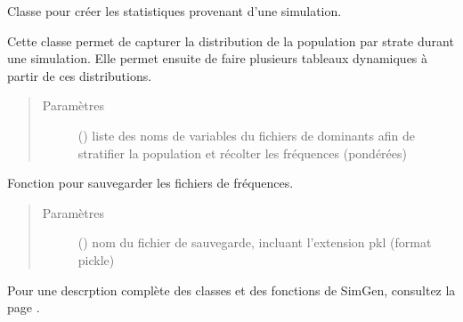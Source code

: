 \documentclass[letterpaper,10pt,french]{sphinxmanual}
\begin{document}
\begin{fulllineitems}
Classe pour créer les statistiques provenant d’une simulation.

Cette classe permet de capturer la distribution de la population par strate durant une simulation. Elle permet ensuite de faire plusieurs tableaux dynamiques à partir de ces distributions.
\begin{quote}\begin{description}
\item[{Paramètres}] \leavevmode
{} () \textendash{} liste des noms de variables du fichiers de dominants afin de stratifier la population et récolter les fréquences (pondérées)

\end{description}\end{quote}

\begin{fulllineitems}
\label{\detokenize{utilisation:simgen.statistics.save}}
Fonction pour sauvegarder les fichiers de fréquences.
\begin{quote}\begin{description}
\item[{Paramètres}] \leavevmode
{} () \textendash{} nom du fichier de sauvegarde, incluant l’extension pkl (format pickle)

\end{description}\end{quote}

\end{fulllineitems}


\end{fulllineitems}


\begin{DUlineblock}{0em}
\item[] 
\end{DUlineblock}

Pour une descrption complète des classes et des fonctions de SimGen, consultez la page {\hyperref[\detokenize{code:code}]{}}.
\end{document}
